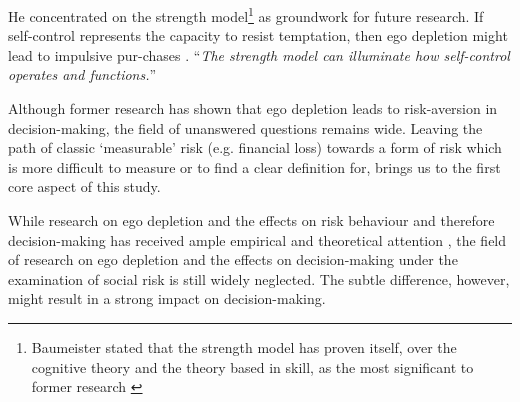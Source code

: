 He concentrated on the strength model\footnote{Baumeister stated that the strength model has proven itself, over the cognitive theory and the theory based in skill, as the most significant to former research \citep{baumeister2012self}} as groundwork for future research. If self-control represents the capacity to resist temptation, then ego depletion might lead to impulsive pur-chases \citep{baumeister2002yielding,baumeister2012self}. “\emph{The strength model can illuminate how self-control operates and functions.}” \citep{baumeister2007strength}\par
Although former research has shown that ego depletion leads to risk-aversion in decision-making, the field of unanswered questions remains wide. Leaving the path of classic ‘measurable’ risk (e.g. financial loss) towards a form of risk which is more difficult to measure or to find a clear definition for, brings us to the first core aspect of this study. \par
While research on ego depletion and the effects on risk behaviour and therefore decision-making has received ample empirical and theoretical attention \citep{vohs2008making,vohs2007spent,unger2011ego}, the field of research on ego depletion and the effects on decision-making under the examination of social risk is still widely neglected. The subtle difference, however, might result in a strong impact on decision-making.\par

